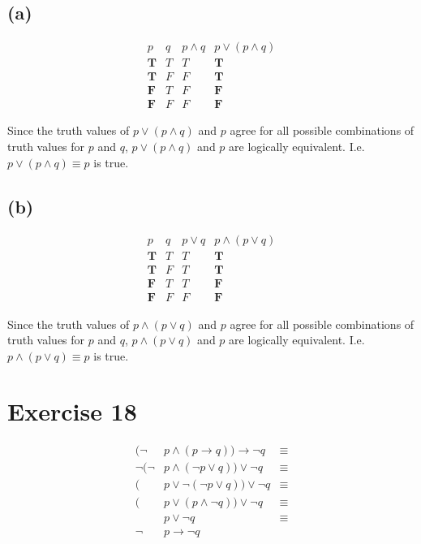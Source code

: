 \documentclass{article}
\let\conditional\rightarrow
\begin{document}
\subsection{(a)}
\[
	\begin{array}{|c|c|c|c|}
		p          & q & p \land q & p \lor (p \land q) \\
		\hline
		\textbf{T} & T & T         & \textbf{T}         \\
		\textbf{T} & F & F         & \textbf{T}         \\
		\textbf{F} & T & F         & \textbf{F}         \\
		\textbf{F} & F & F         & \textbf{F}
	\end{array}
\]

Since the truth values of $p \lor (p \land q)$ and $p$ agree for all possible combinations of truth values for $p$ and $q$, $p \lor (p \land q)$ and $p$ are logically equivalent. I.e. $p \lor (p \land q) \equiv p$ is true.

\subsection{(b)}
\[
	\begin{array}{|c|c|c|c|}
		p          & q & p \lor q & p \land (p \lor q) \\
		\hline
		\textbf{T} & T & T        & \textbf{T}         \\
		\textbf{T} & F & T        & \textbf{T}         \\
		\textbf{F} & T & T        & \textbf{F}         \\
		\textbf{F} & F & F        & \textbf{F}
	\end{array}
\]

Since the truth values of $p \land (p \lor q)$ and $p$ agree for all possible combinations of truth values for $p$ and $q$, $p \land (p \lor q)$ and $p$ are logically equivalent. I.e. $p \land (p \lor q) \equiv p$ is true.

\pagebreak

\section{Exercise 18}

\begin{align*}
	(\neg      & p \land (p \conditional q)) \conditional \neg q & \equiv \\
	\neg (\neg & p \land (\neg p \lor q)) \lor \neg q            & \equiv \\
	(          & p \lor \neg (\neg p \lor q)) \lor \neg q        & \equiv \\
	(          & p \lor (p \land \neg q)) \lor \neg q            & \equiv \\
	           & p \lor \neg q                                   & \equiv \\
	\neg       & p \conditional \neg q
\end{align*}
\end{document}
